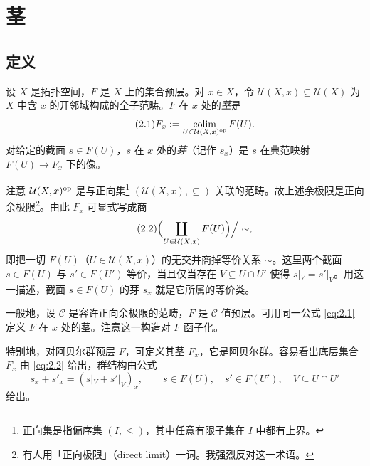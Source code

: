 
\section{茎}\label{sec:2}

\subsection{定义}\label{sec:2.1}

\begin{definition}\label{def:2.1.1}
设 $X$ 是拓扑空间，$F$ 是 $X$ 上的集合预层。对 $x\in X$，令 $\mathcal U(X,x)\subseteq\mathcal U(X)$ 为 $X$ 中含 $x$ 的开邻域构成的全子范畴。$F$ 在 $x$ 处的\emph{茎}是
\begin{equation}\tag{2.1}\label{eq:2.1}
F_x:=\operatorname*{colim}_{U\in\mathcal U(X,x)^{\mathrm{op}}}F(U).
\end{equation}
对给定的截面 $s\in F(U)$，$s$ 在 $x$ 处的\emph{芽}（记作 $s_x$）是 $s$ 在典范映射 $F(U)\to F_x$ 下的像。
\end{definition}

注意 $\mathcal U(X,x)^{\mathrm{op}}$ 是与正向集\footnote{正向集是指偏序集 $(I,\le)$，其中任意有限子集在 $I$ 中都有上界。} $(\mathcal U(X,x),\subseteq)$ 关联的范畴。故上述余极限是正向余极限\footnote{有人用「正向极限」（direct limit）一词。我强烈反对这一术语。}。由此 $F_x$ 可显式写成商
\begin{equation}\tag{2.2}\label{eq:2.2}
\Bigl(\coprod_{U\in\mathcal U(X,x)}F(U)\Bigr)\Big/\sim,
\end{equation}
即把一切 $F(U)$（$U\in\mathcal U(X,x)$）的无交并商掉等价关系 $\sim$。这里两个截面 $s\in F(U)$ 与 $s'\in F(U')$ 等价，当且仅当存在 $V\subseteq U\cap U'$ 使得 $s|_V=s'|_V$。用这一描述，截面 $s\in F(U)$ 的芽 $s_x$ 就是它所属的等价类。

\begin{remark}\label{rem:2.1.2}
一般地，设 $\mathcal C$ 是容许正向余极限的范畴，$F$ 是 $\mathcal C$-值预层。可用同一公式 \eqref{eq:2.1} 定义 $F$ 在 $x$ 处的茎。注意这一构造对 $F$ 函子化。

特别地，对阿贝尔群预层 $F$，可定义其茎 $F_x$，它是阿贝尔群。容易看出底层集合 $F_x$ 由 \eqref{eq:2.2} 给出，群结构由公式
\[
s_x+s'_x=(s|_V+s'|_V)_x,\qquad s\in F(U),\quad s'\in F(U'),\quad V\subseteq U\cap U'
\]
给出。
\end{remark}

